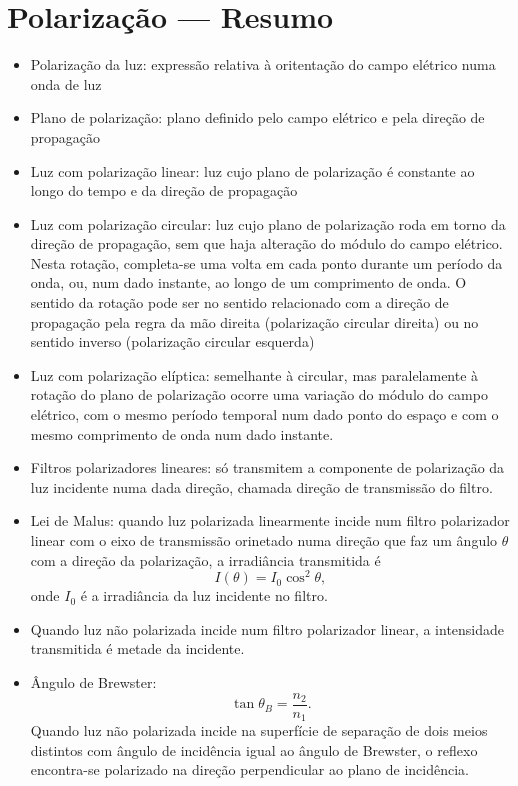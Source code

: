 \section*{Polarização --- Resumo}
\begin{itemize}[leftmargin=*]
\item
  Polarização da luz: expressão relativa à oritentação do campo elétrico numa
  onda de luz
\item
  Plano de polarização: plano definido pelo campo elétrico e pela direção de
  propagação
\item
  Luz com polarização linear: luz cujo plano de polarização é constante ao longo
  do tempo e da direção de propagação
\item
  Luz com polarização circular: luz cujo plano de polarização roda em torno da
  direção de propagação, sem que haja alteração do módulo do campo elétrico.
  Nesta rotação, completa-se uma volta em cada ponto durante um período da onda,
  ou, num dado instante, ao longo de um comprimento de onda. O sentido da
  rotação pode ser no sentido relacionado com a direção de propagação pela regra
  da mão direita (polarização circular direita) ou no sentido inverso
  (polarização circular esquerda)
\item
  Luz com polarização elíptica: semelhante à circular, mas paralelamente à
  rotação do plano de polarização ocorre uma variação do módulo do campo
  elétrico, com o mesmo período temporal num dado ponto do espaço e com o mesmo
  comprimento de onda num dado instante.
\item
  Filtros polarizadores lineares: só transmitem a componente de polarização da
  luz incidente numa dada direção, chamada direção de transmissão do filtro.
\item
  Lei de Malus: quando luz polarizada linearmente incide num filtro polarizador
  linear com o eixo de transmissão orinetado numa direção que faz um ângulo
  $\theta$ com a direção da polarização, a irradiância transmitida é
  \begin{equation*}
  I(\theta)=I_0\cos^2\theta,
  \end{equation*}
  onde $I_0$ é a irradiância da luz incidente no filtro.
\item
  Quando luz não polarizada incide num filtro polarizador linear, a intensidade
  transmitida é metade da incidente.
\item
  Ângulo de Brewster:
  \begin{equation*}
  \tan\theta_B=\frac{n_2}{n_1}.
  \end{equation*}
  Quando luz não polarizada incide na superfície de separação de dois meios
  distintos com ângulo de incidência igual ao ângulo de Brewster, o reflexo
  encontra-se polarizado na direção perpendicular ao plano de incidência.
  
  
\end{itemize}
